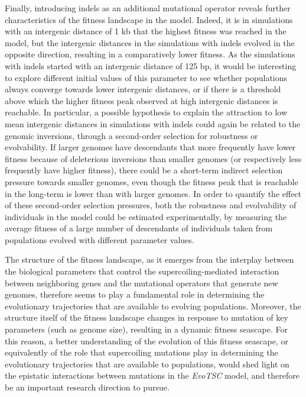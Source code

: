 Finally, introducing indels as an additional mutational operator reveals further characteristics of the fitness landscape in the model.
Indeed, it is in simulations with an intergenic distance of 1 kb that the highest fitness was reached in the model, but the intergenic distances in the simulations with indels evolved in the opposite direction, resulting in a comparatively lower fitness.
As the simulations with indels started with an intergenic distance of 125 bp, it would be interesting to explore different initial values of this parameter to see whether populations always converge towards lower intergenic distances, or if there is a threshold above which the higher fitness peak observed at high intergenic distances is reachable.
In particular, a possible hypothesis to explain the attraction to low mean intergenic distances in simulations with indels could again be related to the genomic inversions, through a second-order selection for robustness or evolvability.
If larger genomes have descendants that more frequently have lower fitness because of deleterious inversions than smaller genomes (or respectively less frequently have higher fitness), there could be a short-term indirect selection pressure towards smaller genomes, even though the fitness peak that is reachable in the long-term is lower than with larger genomes.
In order to quantify the effect of these second-order selection pressures, both the robustness and evolvability of individuals in the model could be estimated experimentally, by measuring the average fitness of a large number of descendants of individuals taken from populations evolved with different parameter values.

The structure of the fitness landscape, as it emerges from the interplay between the biological parameters that control the supercoiling-mediated interaction between neighboring genes and the mutational operators that generate new genomes, therefore seems to play a fundamental role in determining the evolutionary trajectories that are available to evolving populations.
Moreover, the structure itself of the fitness landscape changes in response to mutation of key parameters (such as genome size), resulting in a dynamic fitness seascape.
For this reason, a better understanding of the evolution of this fitness seascape, or equivalently of the role that supercoiling mutations play in determining the evolutionary trajectories that are available to populations, would shed light on the epistatic interactions between mutations in the \emph{EvoTSC} model, and therefore be an important research direction to pursue.
